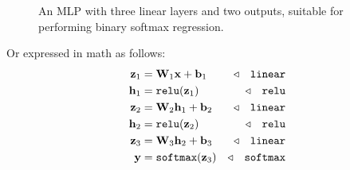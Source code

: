 \begin{figure}[h]
{
    }
    \caption{An MLP with three linear layers and two outputs, suitable for performing binary softmax regression.}
    \label{fig:neural_nets:simple_MLP_network2}
\end{figure}

Or expressed in math as follows:
\begin{align}
    \mathbf{z}_1 & = \mathbf{W}_1\mathbf{x} + \mathbf{b}_1   & \triangleleft \quad \texttt{linear}         \\
    \mathbf{h}_1 & = \texttt{relu}(\mathbf{z}_1)             & \triangleleft \quad \texttt{relu}           \\
    \mathbf{z}_2 & = \mathbf{W}_2\mathbf{h}_1 + \mathbf{b}_2 & \triangleleft \quad \texttt{linear}         \\
    \mathbf{h}_2 & = \texttt{relu}(\mathbf{z}_2)             & \triangleleft \quad \texttt{relu}           \\
    \mathbf{z}_3 & = \mathbf{W}_3\mathbf{h}_2 + \mathbf{b}_3 & \triangleleft \quad \texttt{linear}         \\
    \mathbf{y}   & = \texttt{softmax}(\mathbf{z}_3)          & \triangleleft \quad \text{\texttt{softmax}}
\end{align}




